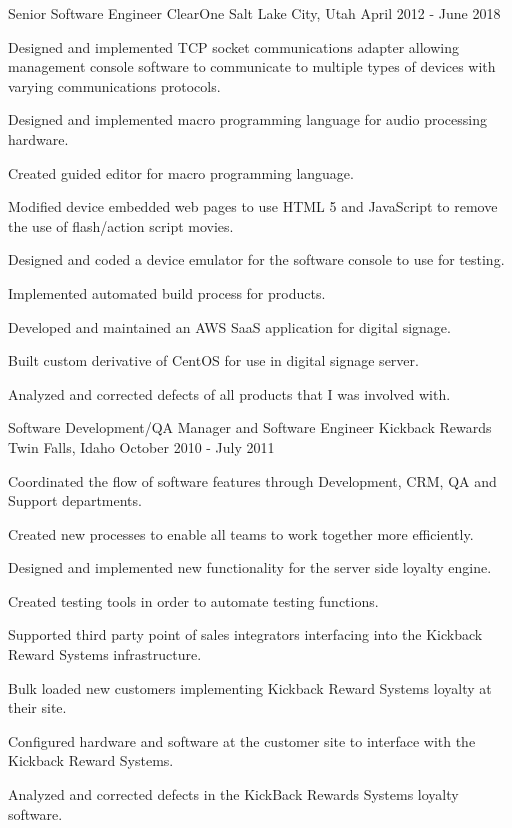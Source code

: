\begin{cventries}
\cventry
{Senior Software Engineer} %
{ClearOne} %
{Salt Lake City, Utah} %
{April 2012 - June 2018} %
{
  \begin{cvitems} %
    \item {Designed and implemented TCP socket communications adapter allowing management console software to communicate to multiple types of devices with varying communications protocols.}
    \item {Designed and implemented macro programming language for audio processing hardware.}
    \item {Created guided editor for macro programming language.}
    \item {Modified device embedded web pages to use HTML 5 and JavaScript to remove the use of flash/action script movies.}
    \item {Designed and coded a device emulator for the software console to use for testing.}
    \item {Implemented automated build process for products.}
    \item {Developed and maintained an AWS SaaS application for digital signage.}
    \item {Built custom derivative of CentOS for use in digital signage server.}
    \item {Analyzed and corrected defects of all products that I was involved with.}
  \end{cvitems}
}

\cventry
{Software Development/QA Manager and Software Engineer} %
{Kickback Rewards} %
{Twin Falls, Idaho} %
{October 2010 - July 2011} %
{
	\begin{cvitems} %
		\item {Coordinated the flow of software features through Development, CRM, QA and Support departments.}
		\item {Created new processes to enable all teams to work together more efficiently.}
		\item {Designed and implemented new functionality for the server side loyalty engine.}
		\item {Created testing tools in order to automate testing functions.}
		\item {Supported third party point of sales integrators interfacing into the Kickback Reward Systems infrastructure.}
		\item {Bulk loaded new customers implementing Kickback Reward Systems loyalty at their site.}
		\item {Configured hardware and software at the customer site to interface with the Kickback Reward Systems.}
		\item {Analyzed and corrected defects in the KickBack Rewards Systems loyalty software.}
	\end{cvitems}
}


\end{cventries}
